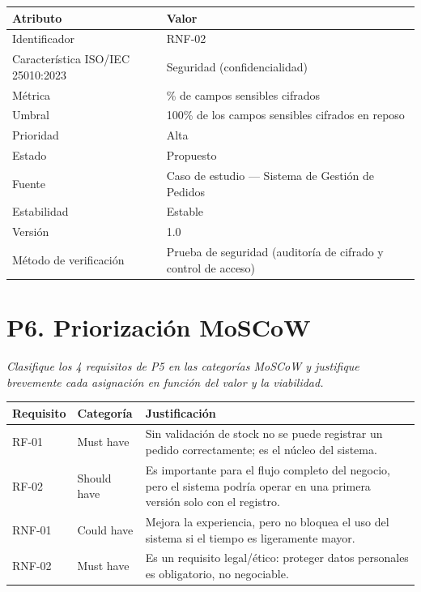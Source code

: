 \documentclass[11pt]{article}
\begin{document}
\begin{center}
\begin{tabular}{|p{4cm}|p{9cm}|}
\hline
\textbf{Atributo} & \textbf{Valor} \\
\hline
Identificador & RNF-02 \\
\hline
Característica ISO/IEC 25010:2023 & Seguridad (confidencialidad) \\
\hline
Métrica & \% de campos sensibles cifrados \\
\hline
Umbral & 100\% de los campos sensibles cifrados en reposo \\
\hline
Prioridad & Alta \\
\hline
Estado & Propuesto \\
\hline
Fuente & Caso de estudio --- Sistema de Gestión de Pedidos \\
\hline
Estabilidad & Estable \\
\hline
Versión & 1.0 \\
\hline
Método de verificación & Prueba de seguridad (auditoría de cifrado y control de acceso) \\
\hline
\end{tabular}
\end{center}

\newpage

\section*{P6. Priorización MoSCoW}

\textit{Clasifique los 4 requisitos de P5 en las categorías MoSCoW y justifique brevemente cada asignación en función del valor y la viabilidad.}

\begin{center}
\small
\begin{tabular}{|p{1.7cm}|p{2.3cm}|p{9.5cm}|}
\hline
\textbf{Requisito} & \textbf{Categoría} & \textbf{Justificación} \\
\hline
RF-01 & Must have & Sin validación de stock no se puede registrar un pedido correctamente; es el núcleo del sistema. \\
\hline
RF-02 & Should have & Es importante para el flujo completo del negocio, pero el sistema podría operar en una primera versión solo con el registro. \\
\hline
RNF-01 & Could have & Mejora la experiencia, pero no bloquea el uso del sistema si el tiempo es ligeramente mayor. \\
\hline
RNF-02 & Must have & Es un requisito legal/ético: proteger datos personales es obligatorio, no negociable. \\
\hline
\end{tabular}
\end{center}
\end{document}
